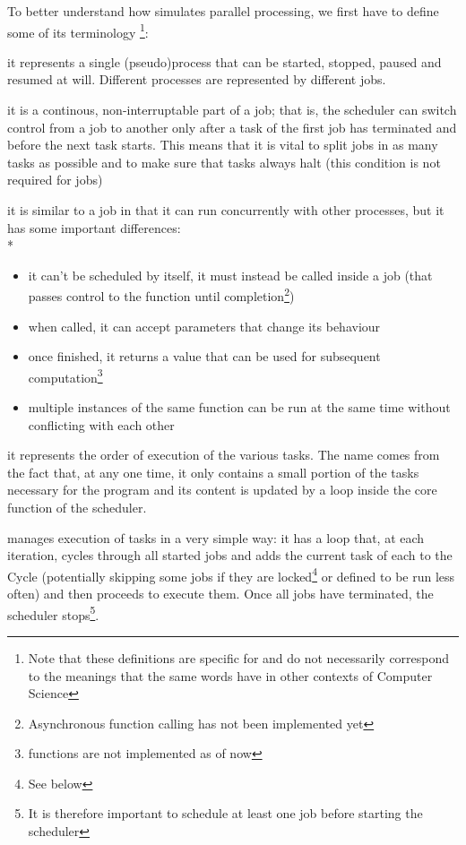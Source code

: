   \beforelist* To better understand how \ScheMo{} simulates parallel processing,
  we first have to define some of its terminology%
  \footnote{Note that these definitions are specific for \ScheMo{} and
  do not necessarily correspond to the meanings that the same words
  have in other contexts of Computer Science}:
  \begin{description}[align=right]
    \item [Job] it represents a single (pseudo)process that can be
      started, stopped, paused and resumed at will. Different
      processes are represented by different jobs.
    \item [Task] it is a continous, non-interruptable part of a job;
      that is, the scheduler can switch control from a job to
      another only after a task of the first job has terminated and
      before the next task starts. This means that it is vital to
      split jobs in as many tasks as possible and to make sure that
      tasks always halt (this condition is not required for jobs)
    \item [Function] it is similar to a job in that it can run
      concurrently with other processes, but it has some important
      differences:\\*
      \begin{itemize}
        \item it can't be scheduled by itself, it must instead be
          called inside a job (that passes control to the function
          until completion\footnote{Asynchronous function calling
          has not been implemented yet})
        \item when called, it can accept parameters that change its
          behaviour
        \item once finished, it returns a value that can be used for
          subsequent computation\footnote{ functions are
          not implemented as of now}
        \item multiple instances of the same function can be run at
          the same time without conflicting with each other
      \end{itemize}
    \item [Cycle] it represents the order of execution of the
      various tasks. The name comes from the fact that, at any one
      time, it only contains a small portion of the tasks necessary
      for the program and its content is updated by a loop inside
      the core function of the scheduler.
  \end{description}
  \afterlist*
  \ScheMo{} manages execution of tasks in a very simple way: it has a
  loop that, at each iteration, cycles through all started jobs and
  adds the current task of each to the Cycle (potentially skipping
  some jobs if they are locked\footnote{See below} or defined to be
  run less often) and then proceeds to execute them. Once all jobs
  have terminated, the scheduler stops\footnote{It is therefore
  important to schedule at least one job before starting the
  scheduler}.

